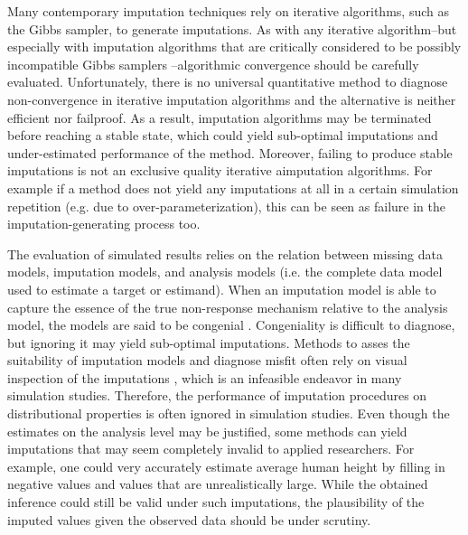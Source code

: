 \documentclass[bimj,fleqn]{w-art}
\begin{document}
Many contemporary imputation techniques rely on iterative algorithms, such as the Gibbs sampler, to generate imputations. As with any iterative algorithm--but especially with imputation algorithms that are critically considered to be possibly incompatible Gibbs samplers \citep[PIGS,][]{li2012imputing}--algorithmic convergence should be carefully evaluated. Unfortunately, there is no universal quantitative method to diagnose non-convergence in iterative imputation algorithms \citep{zhu15, ober21} and the alternative \citep[visual inspection of the imputation algorithm;][]{fimd} is neither efficient nor failproof. As a result, imputation algorithms may be terminated before reaching a stable state, which could yield sub-optimal imputations and under-estimated performance of the method. Moreover, failing to produce stable imputations is not an exclusive quality iterative aimputation algorithms. For example if a method does not yield any imputations at all in a certain simulation repetition (e.g. due to over-parameterization), this can be seen as failure in the imputation-generating process too. 

The evaluation of simulated results relies on the relation between missing data models, imputation models, and analysis models (i.e. the complete data model used to estimate a target or estimand). When an imputation model is able to capture the essence of the true non-response mechanism relative to the analysis model, the models are said to be congenial \citep{meng94}. Congeniality is difficult to diagnose, but ignoring it may yield sub-optimal imputations. Methods to asses the suitability of imputation models and diagnose misfit often rely on visual inspection of the imputations \citep[see e.g.][]{abayomi2008diagnostics, bond16}, which is an infeasible endeavor in many simulation studies. %
Therefore, the performance of imputation procedures on distributional properties is often ignored in simulation studies. Even though the estimates on the analysis level may be justified, some methods can yield imputations that may seem completely invalid to applied researchers. For example, one could very accurately estimate average human height by filling in negative values and values that are unrealistically large. While the obtained inference could still be valid under such imputations, the plausibility of the imputed values given the observed data should be under scrutiny. 
\end{document}

